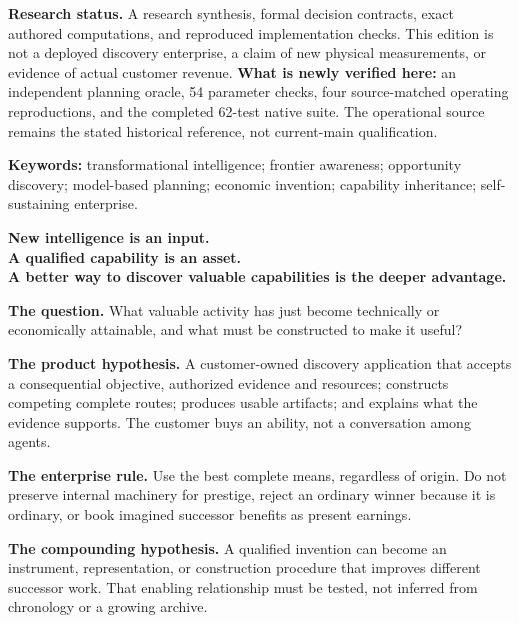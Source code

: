 \documentclass[11pt,letterpaper]{article}
\theoremstyle{remark}\newtheorem{remark}{Remark}[section]
\newcommand{\smallhead}[1]{\par\smallskip{\sffamily\bfseries\color{Gold}#1}\par\smallskip}
\newenvironment{keyidea}{\begin{thesisbox}\bfseries}{\end{thesisbox}}
\begin{document}
\begin{statusbox}
\textbf{Research status.} A research synthesis, formal decision contracts, exact authored computations, and reproduced implementation checks. This edition is not a deployed discovery enterprise, a claim of new physical measurements, or evidence of actual customer revenue. \textbf{What is newly verified here:} an independent planning oracle, 54 parameter checks, four source-matched operating reproductions, and the completed 62-test native suite. The operational source remains the stated historical reference, not current-main qualification.
\end{statusbox}
{\small\textbf{Keywords:} transformational intelligence; frontier awareness; opportunity discovery; model-based planning; economic invention; capability inheritance; self-sustaining enterprise.}

\clearpage
\smallhead{THE PAPER AT A GLANCE}
\begin{keyidea}
New intelligence is an input.\\
A qualified capability is an asset.\\
A better way to discover valuable capabilities is the deeper advantage.
\end{keyidea}
\textbf{The question.} What valuable activity has just become technically or economically attainable, and what must be constructed to make it useful?

\textbf{The product hypothesis.} A customer-owned discovery application that accepts a consequential objective, authorized evidence and resources; constructs competing complete routes; produces usable artifacts; and explains what the evidence supports. The customer buys an ability, not a conversation among agents.

\textbf{The enterprise rule.} Use the best complete means, regardless of origin. Do not preserve internal machinery for prestige, reject an ordinary winner because it is ordinary, or book imagined successor benefits as present earnings.

\textbf{The compounding hypothesis.} A qualified invention can become an instrument, representation, or construction procedure that improves different successor work. That enabling relationship must be tested, not inferred from chronology or a growing archive.
\end{document}
